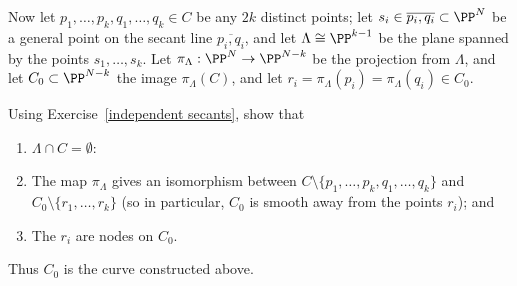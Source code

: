 Now let $p_1,\dots,p_k, q_1,\dots, q_k \in C$ be any $2k$ distinct points; let $s_i \in \overline{p_i,q_i} \subset \PP^N$ be a general point on the secant line $\overline{p_i,q_i} $, and let $\Lambda \cong \PP^{k-1}$ be the plane spanned by the points $s_1,\dots,s_k$. Let $\pi_\Lambda : \PP^N \to \PP^{N-k}$ be the projection from $\Lambda$, and let $C_0 \subset \PP^{N-k}$ the image $\pi_\Lambda(C)$, and let $r_i = \pi_\Lambda(p_i) = \pi_\Lambda(q_i) \in C_0$.

\begin{exercise}
Using Exercise~\ref{independent secants}, show that 
\begin{enumerate}
\item $\Lambda \cap C = \emptyset$:
\item The map $\pi_\Lambda$ gives an isomorphism between $C \setminus \{p_1,\dots,p_k, q_1,\dots, q_k\}$ and $C_0 \setminus \{r_1,\dots,r_k\}$ (so in particular, $C_0$ is smooth away from the points $r_i$); and
\item The $r_i$ are nodes on $C_0$.
\end{enumerate}
\end{exercise}

Thus $C_0$ is the curve constructed above.


